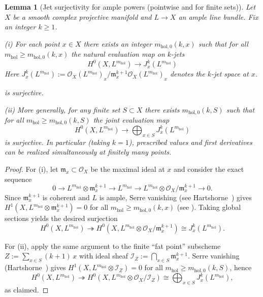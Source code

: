 \documentclass[11pt]{article}
\numberwithin{equation}{section}  %
\theoremstyle{plain}
\newtheorem{lemma}[theorem]{Lemma}
\theoremstyle{definition}
\theoremstyle{remark}
\newcommand{\mhol}{m_{\mathrm{hol}}} %
\begin{document}
\begin{lemma}[Jet surjectivity for ample powers (pointwise and for finite sets)]\label{lem:jet-surjectivity}
Let $X$ be a smooth complex projective manifold and $L\to X$ an ample line bundle.
Fix an integer $k\ge 1$.

\smallskip
\noindent\textup{(i)} For each point $x\in X$ there exists an integer ${m_{\mathrm{hol},0}(k,x)}$ such that for all {$\mhol\ge m_{\mathrm{hol},0}(k,x)$}
the natural evaluation map on $k$-jets
\[
H^0(X,L^{\mhol})\longrightarrow J^k_x(L^{\mhol})
\]
Here $J^k_x(L^{\mhol}):=\mathcal O_X(L^{\mhol})_x/\mathfrak m_x^{k+1}\mathcal O_X(L^{\mhol})_x$ denotes the $k$-jet space at $x$.

is surjective.

\smallskip
\noindent\textup{(ii)} More generally, for any \emph{finite} set $S\subset X$ there exists ${m_{\mathrm{hol},0}(k,S)}$ such that for all {$\mhol\ge m_{\mathrm{hol},0}(k,S)$}
the joint evaluation map
\[
H^0(X,L^{\mhol})\longrightarrow \bigoplus_{x\in S} J^k_x(L^{\mhol})
\]
is surjective.  In particular (taking $k=1$), prescribed values and first derivatives can be realized simultaneously at finitely many points.
\end{lemma}

\begin{proof}
For \textup{(i)}, let $\mathfrak{m}_x\subset \mathcal{O}_X$ be the maximal ideal at $x$ and consider the exact sequence
\[
0\to L^{\mhol}\otimes \mathfrak{m}_x^{k+1}\to L^{\mhol} \to
L^{\mhol}\otimes \mathcal{O}_X/\mathfrak{m}_x^{k+1}\to 0.
\]
Since $\mathfrak{m}_x^{k+1}$ is coherent and $L$ is ample, Serre vanishing (see Hartshorne~\cite[Thm.~III.5.2]{Hartshorne77}) gives
$H^1(X,L^{\mhol}\otimes \mathfrak{m}_x^{k+1})=0$ for all {$\mhol\ge m_{\mathrm{hol},0}(k,x)$} (see \cite[III, Thm.~5.2]{Hartshorne77}).
Taking global sections yields the desired surjection
\[
H^0(X,L^{\mhol})\twoheadrightarrow H^0\!\left(X,L^{\mhol}\otimes \mathcal{O}_X/\mathfrak{m}_x^{k+1}\right)\cong J^k_x(L^{\mhol}).
\]

For \textup{(ii)}, apply the same argument to the finite ``fat point'' subscheme
$Z:=\sum_{x\in S}(k{+}1)\,x$ with ideal sheaf $\mathcal{I}_Z:=\bigcap_{x\in S}\mathfrak{m}_x^{k+1}$.
Serre vanishing (Hartshorne~\cite[Thm.~III.5.2]{Hartshorne77}) gives $H^1(X,L^{\mhol}\otimes \mathcal{I}_Z)=0$ for all {$\mhol\ge m_{\mathrm{hol},0}(k,S)$}, hence
\[
H^0(X,L^{\mhol})\twoheadrightarrow H^0\!\left(X,L^{\mhol}\otimes \mathcal{O}_X/\mathcal{I}_Z\right)\cong
\bigoplus_{x\in S} J^k_x(L^{\mhol}),
\]
as claimed.
\end{proof}
\end{document}
